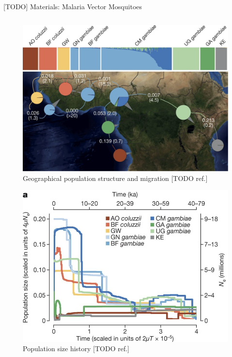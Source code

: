 \documentclass[final,hyperref={pdfpagelabels=false}]{beamer}
\begin{document}
\begin{frame}[t]
\begin{columns}[t]
\begin{column}{.465\textwidth}
\begin{block}{[TODO] Materials: Malaria Vector Mosquitoes}
\begin{columns}
\begin{column}{.6\textwidth}
\begin{figure}
\includegraphics[width=.95\linewidth]{nature-mosquitoes/fig_2}
\caption{Geographical population structure and migration [TODO ref.]}
\end{figure}

\begin{figure}
\includegraphics[width=.95\linewidth]{nature-mosquitoes/fig_3a}
\caption{Population size history [TODO ref.]}
\end{figure}


\end{column}
\end{columns}
\end{block}
\end{column}
\end{columns}
\end{frame}
\end{document}
